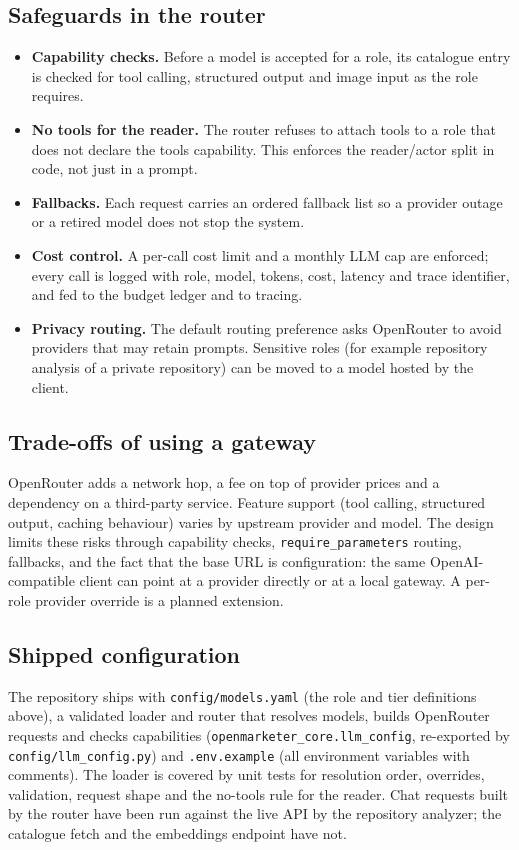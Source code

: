 \documentclass[11pt,a4paper]{article}
\begin{document}
\subsection{Safeguards in the router}
\begin{itemize}
  \item \textbf{Capability checks.} Before a model is accepted for a role, its catalogue entry is checked for tool calling, structured output and image input as the role requires.
  \item \textbf{No tools for the reader.} The router refuses to attach tools to a role that does not declare the tools capability. This enforces the reader/actor split in code, not just in a prompt.
  \item \textbf{Fallbacks.} Each request carries an ordered fallback list so a provider outage or a retired model does not stop the system.
  \item \textbf{Cost control.} A per-call cost limit and a monthly LLM cap are enforced; every call is logged with role, model, tokens, cost, latency and trace identifier, and fed to the budget ledger and to tracing.
  \item \textbf{Privacy routing.} The default routing preference asks OpenRouter to avoid providers that may retain prompts. Sensitive roles (for example repository analysis of a private repository) can be moved to a model hosted by the client.
\end{itemize}

\subsection{Trade-offs of using a gateway}
OpenRouter adds a network hop, a fee on top of provider prices and a dependency on a third-party service. Feature support (tool calling, structured output, caching behaviour) varies by upstream provider and model. The design limits these risks through capability checks, \texttt{require\_parameters} routing, fallbacks, and the fact that the base URL is configuration: the same OpenAI-compatible client can point at a provider directly or at a local gateway. A per-role provider override is a planned extension.

\subsection{Shipped configuration}
The repository ships with \texttt{config/models.yaml} (the role and tier definitions above), a validated loader and router that resolves models, builds OpenRouter requests and checks capabilities (\texttt{openmarketer\_core.llm\_config}, re-exported by \texttt{config/llm\_config.py}) and \texttt{.env.example} (all environment variables with comments). The loader is covered by unit tests for resolution order, overrides, validation, request shape and the no-tools rule for the reader. Chat requests built by the router have been run against the live API by the repository analyzer; the catalogue fetch and the embeddings endpoint have not.
\end{document}

